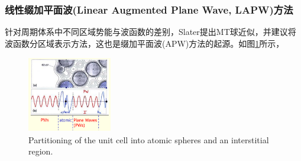 {\subsubsection{线性缀加平面波(Linear Augmented Plane Wave, LAPW)方法}
针对周期体系中不同区域势能与波函数的差别，Slater提出MT球近似，并建议将波函数分区域表示方法\cite{PR51-846_1937,PR91-528_1953}，这也是缀加平面波(APW)方法的起源。如图\ref{Muffin_tin_0}所示，%
\begin{figure}[h!]
\centering
\includegraphics[height=1.30in,width=1.45in,viewport=1 20 485 435,clip]{Figures/APW.png}
\caption{\small \textrm{Partitioning of the unit cell into atomic spheres and an interstitial region.}}%
\label{Muffin_tin_0}
\end{figure}

}
